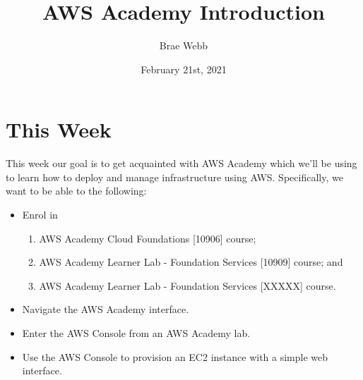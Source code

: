 \documentclass{csse4400}
\title{AWS Academy Introduction}
\author{Brae Webb}
\date{February 21st, 2021}
\begin{document}
\maketitle

\section{This Week}
This week our goal is to get acquainted with AWS Academy which we'll be using to learn how to deploy and manage infrastructure using AWS.
Specifically, we want to be able to the following:
\begin{itemize}
    \item Enrol in
    \begin{enumerate}
        \item AWS Academy Cloud Foundations [10906] course;
        \item AWS Academy Learner Lab - Foundation Services [10909] course; and
        \item AWS Academy Learner Lab - Foundation Services [XXXXX] course.
    \end{enumerate}
    \item Navigate the AWS Academy interface.
    \item Enter the AWS Console from an AWS Academy lab.
    \item Use the AWS Console to provision an EC2 instance with a simple web interface.
\end{itemize}





\end{document}
